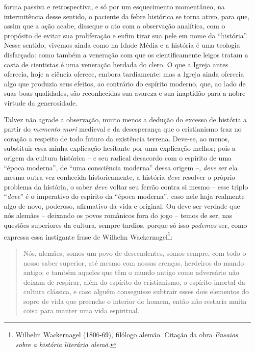 forma passiva e retrospectiva, e só por um esquecimento momentâneo, na
intermitência desse sentido, o paciente da febre histórica se torna
ativo, para que, assim que a ação acabe, disseque o ato com a observação
analítica, com o propósito de evitar sua proliferação e enfim tirar sua
pele em nome da ``história''. Nesse sentido, vivemos ainda como na Idade
Média e a história é uma teologia disfarçada: como também a veneração
com que os cientificamente leigos tratam a casta de cientistas é uma
veneração herdada do clero. O que a Igreja antes oferecia, hoje a ciência
oferece, embora tardiamente: mas a Igreja ainda oferecia algo que
produzia seus efeitos, ao contrário do espírito moderno, que, ao lado de
suas boas qualidades, são reconhecidas sua avareza e sua inaptidão para
a nobre virtude da generosidade.

Talvez não agrade a observação, muito menos a dedução do excesso de
história a partir do \emph{memento mori} medieval e da desesperança que
o cristianismo traz no coração a respeito de todo futuro da existência
terrena. Deve-se, ao menos, substituir essa minha explicação hesitante
por uma explicação melhor; pois a origem da cultura histórica -- e seu
radical desacordo com o espírito de uma ``época moderna'', de ``uma
consciência moderna'' dessa origem --, \emph{deve} ser ela mesma outra vez
conhecida historicamente, a história \emph{deve} resolver o próprio
problema da história, o saber \emph{deve} voltar seu ferrão contra si
mesmo -- esse triplo ``\emph{deve}'' é o imperativo do espírito da
``época moderna'', caso nele haja realmente algo de novo, poderoso,
afirmativo da vida e original. Ou deve ser verdade que nós alemães --
deixando os povos românicos fora do jogo -- temos de ser, nas questões
superiores da cultura, sempre tardios, porque só isso \emph{podemos}
ser, como expressa essa instigante frase de Wilhelm
Wackernagel\footnote{Wilhelm Wackernagel (1806-69), filólogo alemão.
  Citação da obra \emph{Ensaios sobre a história literária alemã}.}:

\begin{quote}
Nós, alemães, somos um povo de descendentes, somos sempre, com todo o
nosso saber superior, até mesmo com nossas crenças, herdeiros do mundo
antigo; e também aqueles que têm o mundo antigo como adversário não
deixam de respirar, além do espírito do cristianismo, o espírito imortal
da cultura clássica, e caso alguém conseguisse subtrair esses dois
elementos do sopro de vida que preenche o interior do homem, então não
restaria muita coisa para manter uma vida espiritual. 
\end{quote}

